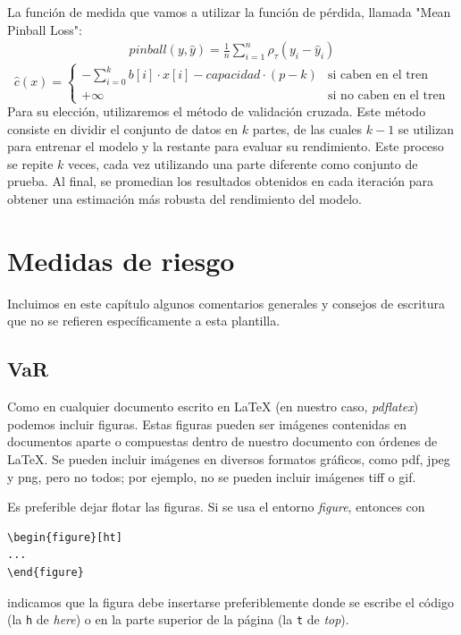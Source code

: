 \documentclass[11pt]{book}
\newcommand{\clearemptydoublepage}{\newpage{\pagestyle{empty}\cleardoublepage}}
\theoremstyle{plain} %
\theoremstyle{definition} %
\begin{document}
La función de medida que vamos a utilizar la función de pérdida, llamada "Mean Pinball Loss":
\begin{align*}
   pinball(y, \hat{y}) = \frac{1}{n}\sum_{i=1}^n\rho_{\tau}(y_i-\hat{y}_i)
\end{align*}
\[
   \hat{c}(x) =
   \begin{cases}
      -\sum_{i=0}^{k} b[i] \cdot x[i] - capacidad\cdot(p-k) & \text{si caben en el tren} \\
      +\infty & \text{si no caben en el tren}
   \end{cases}
\]
Para su elección, utilizaremos el método de validación cruzada. Este método consiste en dividir el conjunto de datos en $k$ partes, de las cuales $k-1$ se utilizan para entrenar el modelo y la restante para evaluar su rendimiento. Este proceso se repite $k$ veces, cada vez utilizando una parte diferente como conjunto de prueba. Al final, se promedian los resultados obtenidos en cada iteración para obtener una estimación más robusta del rendimiento del modelo.\\
\clearemptydoublepage
\chapter{Medidas de riesgo}

Incluimos en este capítulo algunos comentarios generales y consejos de escritura 
que no se refieren específicamente a esta plantilla.

\section{VaR}

Como en cualquier documento escrito en {\LaTeX} (en nuestro caso, 
\emph{pdflatex}) podemos incluir figuras. Estas figuras pueden ser imágenes 
contenidas en documentos aparte o compuestas dentro de nuestro documento con 
órdenes de \LaTeX. Se pueden incluir imágenes en diversos formatos 
gráficos, como pdf, jpeg y png, pero no todos; por 
ejemplo, no se pueden incluir imágenes tiff o gif.

Es preferible dejar flotar las figuras. Si se usa el entorno \emph{figure}, 
entonces con
\begin{verbatim}
\begin{figure}[ht]
...
\end{figure}
\end{verbatim}
indicamos que la figura debe insertarse preferiblemente donde se escribe el 
código (la \texttt{h} de \emph{here}) o en la parte superior de la página (la 
\texttt{t} de \emph{top}).
\end{document}
